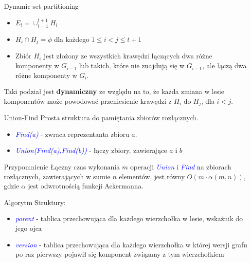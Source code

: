 \documentclass{beamer}
\newcommand{\emp}[1]{\textcolor{blue}{\textit{#1}}}
\begin{document}
\begin{frame}{Dynamic set partitioning}
\begin{itemize}
\item $E_t = \cup^{t+1}_{i=1}H_i$
\item $H_i \cap H_j = \phi$ dla każdego $1 \leq i < j \leq t+1$
\item Zbiór $H_i$ jest złożony ze wszystkich krawędzi łączących dwa różne komponenty w $G_{i-1}$ lub takich, które nie znajdują się w $G_{i-1}$, ale łączą dwa różne komponenty w $G_i$.
\end{itemize}

\begin{block}{}
Taki podział jest \textbf{dynamiczny} ze względu na to, że każda zmiana w lesie komponentów może powodować przeniesienie krawędzi z $H_i$ do $H_j$, dla $i < j$.
\end{block}
\end{frame}

\begin{frame}{Union-Find}
Prosta struktura do pamiętania zbiorów rozłącznych.
\begin{itemize}
\item \emp{Find(a)} - zwraca reprezentanta zbioru $a$. 
\item \emp{Union(Find(a),Find(b))} - łączy zbiory, zawierające $a$ i $b$
\end{itemize}
\begin{block}{Przypomnienie}
Łączny czas wykonania $m$ operacji \emp{Union} i \emp{Find} na zbiorach rozłącznych, zawierających w sumie $n$ elementów, jest równy $O(m\cdot\alpha(m,n))$, gdzie $\alpha$ jest odwrotnością funkcji Ackermanna.
\end{block}
\end{frame}

\begin{frame}{Algorytm}
Struktury:
\begin{itemize}
\item \emp{parent} - tablica przechowująca dla każdego wierzchołka w lesie, wskaźnik do jego ojca
\item \emp{version} - tablica przechowująca dla każdego wierzchołka w której wersji grafu po raz pierwszy pojawił się komponent związany z tym wierzchołkiem
\end{itemize}
\end{frame}
\end{document}
